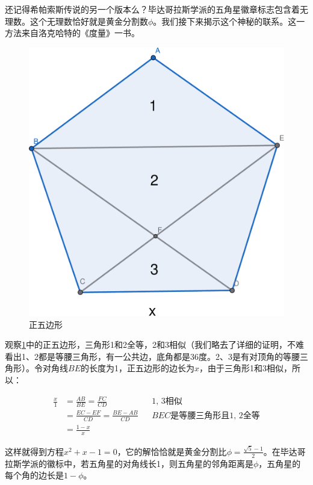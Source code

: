\documentclass[b5paper]{ctexart}
\begin{document}
还记得希帕索斯传说的另一个版本么？毕达哥拉斯学派的五角星徽章标志包含着无理数。这个无理数恰好就是黄金分割数$\phi$。我们接下来揭示这个神秘的联系。这一方法来自洛克哈特的《度量》一书。

\begin{figure}[htbp]
 \centering
 \includegraphics[scale=0.3]{img/pentagon}
 \caption{正五边形}
 \label{fig:pentagon}
\end{figure}

\label{sec:pentagon-edge}
观察\cref{fig:pentagon}中的正五边形，三角形1和2全等，2和3相似（我们略去了详细的证明，不难看出1、2都是等腰三角形，有一公共边，底角都是36度。2、3是有对顶角的等腰三角形）。令对角线$BE$的长度为1，正五边形的边长为$x$，由于三角形1和3相似，所以：

\begin{align*}
\frac{x}{1} &= \frac{AB}{BE} = \frac{FC}{CD} && \text{1, 3相似} \\
            &= \frac{EC - EF}{CD} = \frac{BE - AB}{CD} && BEC\text{是等腰三角形且1, 2全等} \\
            &= \frac{1-x}{x}
\end{align*}

这样就得到方程$x^2 + x - 1 = 0$，它的解恰恰就是黄金分割比$\phi = \frac{\sqrt{5} - 1}{2}$。在毕达哥拉斯学派的徽标中，若五角星的对角线长1，则五角星的邻角距离是$\phi$，五角星的每个角的边长是$1 - \phi$。
\end{document}
